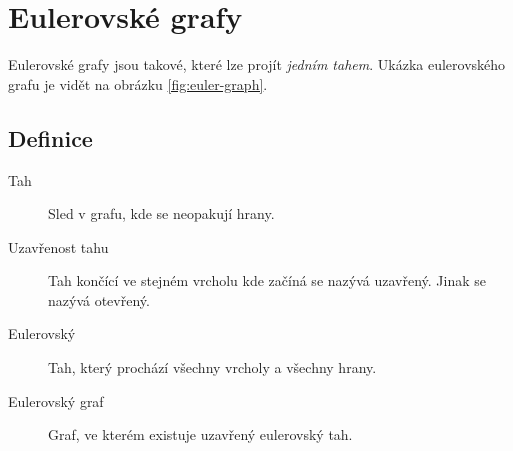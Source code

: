 \section{Eulerovské grafy}

Eulerovské grafy jsou takové, které lze projít \textit{jedním tahem}.
Ukázka eulerovského grafu je vidět na obrázku \ref{fig:euler-graph}.


\subsection{Definice}

\begin{description}
    \item[Tah] Sled v grafu, kde se neopakují hrany.
    \item[Uzavřenost tahu] Tah končící ve stejném vrcholu kde začíná se nazývá uzavřený.
    Jinak se nazývá otevřený.
    \item[Eulerovský] Tah, který prochází všechny vrcholy a všechny hrany.
    \item[Eulerovský graf] Graf, ve kterém existuje uzavřený eulerovský tah.
\end{description}

